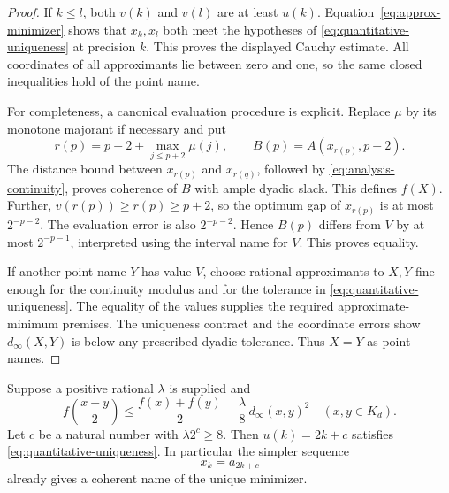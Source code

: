 \begin{proof}
If $k\le l$, both $v(k)$ and $v(l)$ are at least $u(k)$.
Equation~\eqref{eq:approx-minimizer} shows that $x_k,x_l$ both meet
the hypotheses of \eqref{eq:quantitative-uniqueness} at precision $k$.
This proves the displayed Cauchy estimate.  All coordinates of all
approximants lie between zero and one, so the same closed inequalities
hold of the point name.

For completeness, a canonical evaluation procedure is explicit.  Replace
$\mu$ by its monotone majorant if necessary and put
\[
 r(p)=p+2+\max_{j\le p+2}\mu(j),\qquad
 B(p)=A(x_{r(p)},p+2).
\]
The distance bound between $x_{r(p)}$ and $x_{r(q)}$, followed by
\eqref{eq:analysis-continuity}, proves coherence of $B$ with ample
dyadic slack.  This defines $f(X)$.  Further,
$v(r(p))\ge r(p)\ge p+2$, so the optimum gap of $x_{r(p)}$ is at
most $2^{-p-2}$.  The evaluation error is also $2^{-p-2}$.
Hence $B(p)$ differs from $V$ by at most $2^{-p-1}$, interpreted using
the interval name for $V$.  This proves equality.

If another point name $Y$ has value $V$, choose rational approximants
to $X,Y$ fine enough for the continuity modulus and for the tolerance in
\eqref{eq:quantitative-uniqueness}.  The equality of the values supplies
the required approximate-minimum premises.  The uniqueness contract and
the coordinate errors show $d_\infty(X,Y)$ is below any prescribed
dyadic tolerance.  Thus $X=Y$ as point names.
\end{proof}

\begin{corollary}
\label{cor:strong-convexity}
Suppose a positive rational $\lambda$ is supplied and
\begin{equation}
 f\!\left(\frac{x+y}{2}\right)
 \le\frac{f(x)+f(y)}2
       -\frac{\lambda}{8}\,d_\infty(x,y)^2
 \quad(x,y\in K_d).
 \label{eq:midpoint-drop}
\end{equation}
Let $c$ be a natural number with $\lambda2^c\ge8$.
Then $u(k)=2k+c$ satisfies \eqref{eq:quantitative-uniqueness}.
In particular the simpler sequence
\[
 x_k=a_{2k+c}
\]
already gives a coherent name of the unique minimizer.
\end{corollary}

